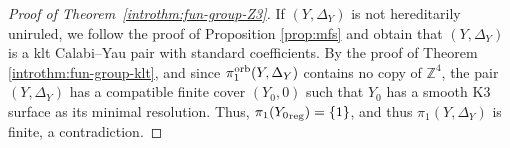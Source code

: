 \documentclass{amsart}
\newcommand{\zz}{\mathbb{Z}}
\theoremstyle{definition}
\theoremstyle{remark}
\numberwithin{equation}{section}
\begin{document}
\begin{proof}[Proof of Theorem~\ref{introthm:fun-group-Z3}]
If $(Y,\Delta_Y)$ is not hereditarily uniruled, we follow the proof of Proposition \ref{prop:mfs} and obtain that $(Y,\Delta_Y)$ is a klt Calabi--Yau pair with standard coefficients. By the proof of Theorem \ref{introthm:fun-group-klt}, and since $\pi_1^{\rm orb}(Y,\Delta_Y)$ contains no copy of $\zz^4$, the pair $(Y,\Delta_Y)$ has a compatible finite cover $(Y_0,0)$ such that $Y_0$ has a smooth K3 surface as its minimal resolution. Thus, $\pi_1({Y_0}_{\rm reg})=\{1\}$, and thus $\pi_1(Y,\Delta_Y)$ is finite, a contradiction.

\end{proof}
\end{document}
